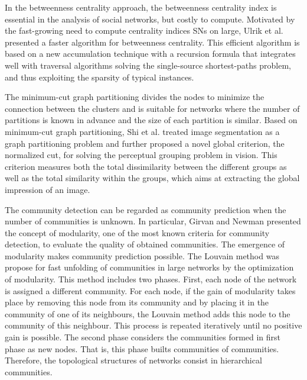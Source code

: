 \documentclass[10pt, journal]{IEEEtran}
\begin{document}

In the betweenness centrality approach, the betweenness centrality index is essential in the analysis of social networks, but costly to compute. Motivated by the fast-growing need to compute centrality indices SNs on large, Ulrik et al. \cite{brandes2001faster} presented a faster algorithm for betweenness centrality. This  efficient algorithm is based on a new accumulation technique with a recursion formula that integrates well with traversal algorithms solving the single-source shortest-paths problem, and thus exploiting the sparsity of typical instances.

The minimum-cut graph partitioning divides the nodes to minimize the connection between the clusters and is suitable for networks where the number of partitions is known in advance and the size of each partition is similar. Based on minimum-cut graph partitioning, Shi et al. \cite{ shi2000normalized} treated image segmentation as a graph partitioning problem and further proposed a novel global criterion, the normalized cut, for solving the perceptual grouping problem in vision. This criterion measures both the total dissimilarity between the different groups as well as the total similarity within the groups, which aims at extracting the global impression of an image.

The community detection can be regarded as community prediction when the number of communities is unknown. In particular, Girvan and Newman \cite{newman2004analysis} presented the concept of modularity, one of the most known criteria for community detection, to evaluate the quality of obtained communities. The emergence of modularity makes community prediction possible. The Louvain method \cite{blondel2008fast} was propose for fast unfolding of communities in large networks by the optimization of modularity. This method includes two phases. First, each node of the network is assigned a different community. For each node, if the gain of modularity takes place by removing this node from its community and by placing it in the community of one of its neighbours, the Louvain method adds this node to the community of this neighbour. This process is repeated iteratively until no positive gain is possible. The second phase considers the communities formed in first phase as new nodes. That is, this phase builts  communities of communities. Therefore, the topological structures of networks consist in hierarchical communities.
\end{document}
